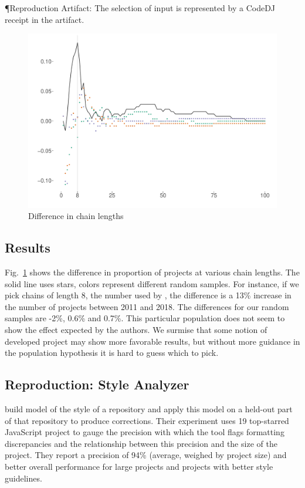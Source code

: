 \documentclass[sigconf,review,anonymous]{acmart}
\renewcommand{\dj}{{\textsf{Code{\small{DJ}}}}\xspace}
\begin{document}
\P{Reproduction Artifact:} The selection of input is represented by a \dj
receipt in the artifact.

\begin{figure}[!h]
  \includegraphics[width=\columnwidth]{../figs/method_chainings/final_graph.pdf}
  \caption{Difference in chain lengths}\label{fig:un_difference}
\end{figure}

\subsection*{Results}

Fig.~\ref{fig:un_difference} shows the difference in proportion of projects at
various chain lengths. The solid line uses stars, colors represent different
random samples. For instance, if we pick chains of length 8, the number used by
\citet{nakamaru:2020:MSR}, the difference is a 13\% increase in the number of
projects between 2011 and 2018. The differences for our random samples are -2\%,
0.6\% and 0.7\%. This particular population does not seem to show the effect
expected by the authors. We surmise that some notion of developed project may
show more favorable results, but without more guidance in the population
hypothesis it is hard to guess which to pick.


\newpage
\subsection{Reproduction: Style Analyzer}

\citet{Markovtsev:2019:MSR} build model of the style of a repository and apply
this model on a held-out part of that repository to produce corrections. Their
experiment uses 19 top-starred JavaScript project to gauge the precision with
which the tool flags formatting discrepancies and the relationship between this
precision and the size of the project. They report a precision of 94\% (average,
weighed by project size) and better overall performance for large projects and
projects with better style guidelines.
\end{document}
